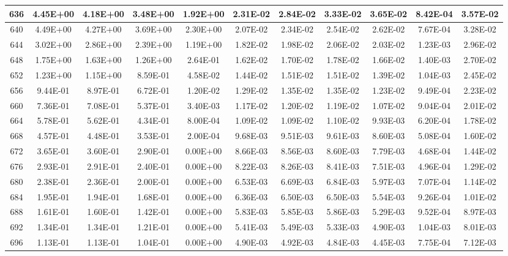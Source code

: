\begin{landscape}
\begin{longtable}{c||c|c|c|c|c|c|c|c|c|c}
        636 & 4.45E+00 & 4.18E+00 & 3.48E+00 & 1.92E+00 & 2.31E-02 & 2.84E-02 & 3.33E-02 & 3.65E-02 & 8.42E-04 & 3.57E-02 \\ \hline
        640 & 4.49E+00 & 4.27E+00 & 3.69E+00 & 2.30E+00 & 2.07E-02 & 2.34E-02 & 2.54E-02 & 2.62E-02 & 7.67E-04 & 3.28E-02 \\ \hline
        644 & 3.02E+00 & 2.86E+00 & 2.39E+00 & 1.19E+00 & 1.82E-02 & 1.98E-02 & 2.06E-02 & 2.03E-02 & 1.23E-03 & 2.96E-02 \\ \hline
        648 & 1.75E+00 & 1.63E+00 & 1.26E+00 & 2.64E-01 & 1.62E-02 & 1.70E-02 & 1.78E-02 & 1.66E-02 & 1.40E-03 & 2.70E-02 \\ \hline
        652 & 1.23E+00 & 1.15E+00 & 8.59E-01 & 4.58E-02 & 1.44E-02 & 1.51E-02 & 1.51E-02 & 1.39E-02 & 1.04E-03 & 2.45E-02 \\ \hline
        656 & 9.44E-01 & 8.97E-01 & 6.72E-01 & 1.20E-02 & 1.29E-02 & 1.35E-02 & 1.35E-02 & 1.23E-02 & 9.49E-04 & 2.23E-02 \\ \hline
        660 & 7.36E-01 & 7.08E-01 & 5.37E-01 & 3.40E-03 & 1.17E-02 & 1.20E-02 & 1.19E-02 & 1.07E-02 & 9.04E-04 & 2.01E-02 \\ \hline
        664 & 5.78E-01 & 5.62E-01 & 4.34E-01 & 8.00E-04 & 1.09E-02 & 1.09E-02 & 1.10E-02 & 9.93E-03 & 6.20E-04 & 1.78E-02 \\ \hline
        668 & 4.57E-01 & 4.48E-01 & 3.53E-01 & 2.00E-04 & 9.68E-03 & 9.51E-03 & 9.61E-03 & 8.60E-03 & 5.08E-04 & 1.60E-02 \\ \hline
        672 & 3.65E-01 & 3.60E-01 & 2.90E-01 & 0.00E+00 & 8.66E-03 & 8.56E-03 & 8.60E-03 & 7.79E-03 & 4.68E-04 & 1.44E-02 \\ \hline
        676 & 2.93E-01 & 2.91E-01 & 2.40E-01 & 0.00E+00 & 8.22E-03 & 8.26E-03 & 8.41E-03 & 7.51E-03 & 4.96E-04 & 1.29E-02 \\ \hline
        680 & 2.38E-01 & 2.36E-01 & 2.00E-01 & 0.00E+00 & 6.53E-03 & 6.69E-03 & 6.84E-03 & 5.97E-03 & 7.07E-04 & 1.14E-02 \\ \hline
        684 & 1.95E-01 & 1.94E-01 & 1.68E-01 & 0.00E+00 & 6.36E-03 & 6.50E-03 & 6.50E-03 & 5.54E-03 & 9.26E-04 & 1.01E-02 \\ \hline
        688 & 1.61E-01 & 1.60E-01 & 1.42E-01 & 0.00E+00 & 5.83E-03 & 5.85E-03 & 5.86E-03 & 5.29E-03 & 9.52E-04 & 8.97E-03 \\ \hline
        692 & 1.34E-01 & 1.34E-01 & 1.21E-01 & 0.00E+00 & 5.41E-03 & 5.49E-03 & 5.33E-03 & 4.90E-03 & 1.04E-03 & 8.01E-03 \\ \hline
        696 & 1.13E-01 & 1.13E-01 & 1.04E-01 & 0.00E+00 & 4.90E-03 & 4.92E-03 & 4.84E-03 & 4.45E-03 & 7.75E-04 & 7.12E-03 \\
\end{longtable}
\end{landscape}

